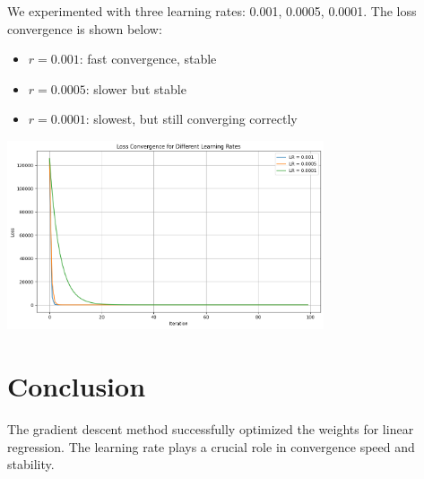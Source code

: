 \documentclass{article}
\begin{document}
We experimented with three learning rates: 0.001, 0.0005, 0.0001. The loss convergence is shown below:

\begin{itemize}
    \item $r = 0.001$: fast convergence, stable
    \item $r = 0.0005$: slower but stable
    \item $r = 0.0001$: slowest, but still converging correctly
\end{itemize}

\begin{center}
    \includegraphics[width=0.7\textwidth]{loss_plot.png}
\end{center}

\section*{Conclusion}

The gradient descent method successfully optimized the weights for linear regression. The learning rate plays a crucial role in convergence speed and stability.
\end{document}
